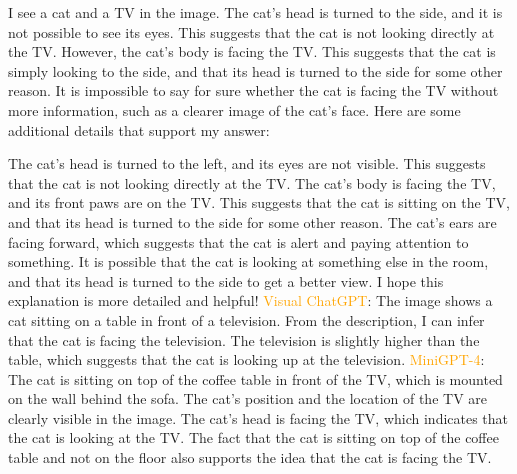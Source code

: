 \begin{enumerate}
    I see a cat and a TV in the image.
    The cat's head is turned to the side, and it is not possible to see its eyes. This suggests that the cat is not looking directly at the TV.
    However, the cat's body is facing the TV. This suggests that the cat is simply looking to the side, and that its head is turned to the side for some other reason.
    It is impossible to say for sure whether the cat is facing the TV without more information, such as a clearer image of the cat's face.
    Here are some additional details that support my answer:
    
    The cat's head is turned to the left, and its eyes are not visible. This suggests that the cat is not looking directly at the TV.
    The cat's body is facing the TV, and its front paws are on the TV. This suggests that the cat is sitting on the TV, and that its head is turned to the side for some other reason.
    The cat's ears are facing forward, which suggests that the cat is alert and paying attention to something. It is possible that the cat is looking at something else in the room, and that its head is turned to the side to get a better view.
    I hope this explanation is more detailed and helpful!
    \subitem \textcolor{orange}{Visual ChatGPT}: The image shows a cat sitting on a table in front of a television. From the description, I can infer that the cat is facing the television. The television is slightly higher than the table, which suggests that the cat is looking up at the television.
    \subitem \textcolor{orange}{MiniGPT-4}: The cat is sitting on top of the coffee table in front of the TV, which is mounted on the wall behind the sofa. The cat’s position and the location of the TV are clearly visible in the image. The cat’s head is facing the TV, which indicates that the cat is looking at the TV. The fact that the cat is sitting on top of the coffee table and not on the floor also supports the idea that the cat is facing the TV.
\end{enumerate}
